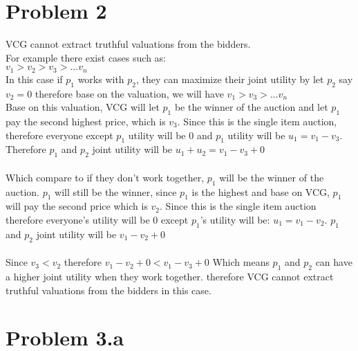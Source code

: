 \documentclass{article}
\begin{document}
\newpage
\section{Problem 2}

VCG cannot extract truthful valuations from the bidders.\\ 
For example there exist cases such as:\\
$v_1 > v_2 > v_3 > ... v_n$\\
In this case if $p_1$ works with $p_2$, they can maximize their joint utility by let $p_2$ say $v_2 = 0$ therefore base on the valuation, we will have  $v_1 > v_3 > ... v_n$\\
Base on this valuation, VCG will let $p_1$ be the winner of the auction and let $p_1$ pay the second highest price, which is $v_3$. Since this is the single item auction, therefore everyone except $p_1$ utility will be $0$ and $p_1$ utility will be $u_1 = v_1 - v_3$. Therefore $p_1$ and $p_2$ joint utility will be $u_1 + u_2 = v_1 - v_3 + 0$\\\\
Which compare to if they don't work together, $p_1$ will be the winner of the auction. $p_1$ will still be the winner, since $p_1$ is the highest and base on VCG, $p_1$ will pay the second price which is $v_2$. Since this is the single item auction therefore everyone's utility will be $0$ except $p_1$'s utility will be: $u_1 = v_1 - v_2$. $p_1$ and $p_2$ joint utility will be $v_1 - v_2 + 0$\\\\
Since $v_3 < v_2$ therefore $v_1 - v_2 + 0 < v_1 - v_3 + 0$ Which means $p_1$ and $p_2$ can have a higher joint utility when they work together. therefore VCG cannot extract truthful valuations from the bidders in this case.
\newpage
\section{Problem 3.a}
\end{document}
